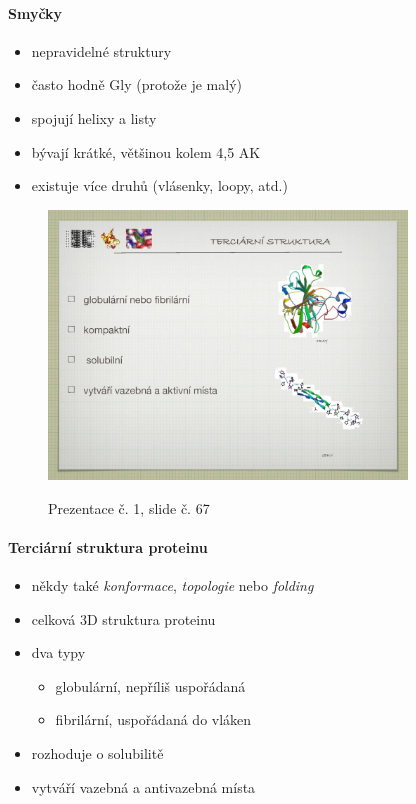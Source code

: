 \documentclass[DIV=8]{scrreprt}
\begin{document}
\paragraph{Smyčky}
\begin{itemize}[nosep]
    \item nepravidelné struktury
    \item často hodně Gly (protože je malý)
    \item spojují helixy a listy
    \item bývají krátké, většinou kolem 4,5 AK
    \item existuje více druhů (vlásenky, loopy, atd.)
\end{itemize}



\begin{figure}
    \caption{Prezentace č. 1, slide č. 67}
    \includegraphics[width=0.85\textwidth]{slides-1/slide-67.jpg}
    \centering
    \label{slides-1-slide-67}
\end{figure}

\paragraph{Terciární struktura proteinu}
\begin{itemize}[nosep]
    \item někdy také \emph{konformace}, \emph{topologie} nebo \emph{folding}
    \item celková 3D struktura proteinu
    \item dva typy
\begin{itemize}[nosep]
    \item globulární, nepříliš uspořádaná
    \item fibrilární, uspořádaná do vláken
\end{itemize}

    \item rozhoduje o solubilitě
    \item vytváří vazebná a antivazebná místa
\end{itemize}
\end{document}
